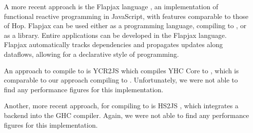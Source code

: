 A more recent approach is the \textsf{Flapjax} language \cite{FLAPJAX}, an implementation of functional reactive programming in \textsf{JavaScript}, with features comparable to those of \textsf{Hop}. \textsf{Flapjax} can be used either as a programming language, compiling to \JS, or as a \JS library. 
Entire applications can be developed in the \textsf{Flapjax} language.  \textsf{Flapjax} automatically tracks dependencies and propagates updates along 
dataflows, allowing for a declarative style of programming.

An approach to compile \Haskell to \JS is \textsf{YCR2JS}\cite{YHC2JS} which compiles \textsf{YHC Core} to \JS, 
which is comparable to our approach compiling \Sapl to \JS. Unfortunately, we were not able to find any performance figures for this implementation.

Another, more recent approach, for compiling \Haskell to \JS is \textsf{HS2JS} \cite{HS2JS}, which integrates a \JS backend into the \textsf{GHC} compiler. 
Again, we were not able to find any performance figures for this implementation.


